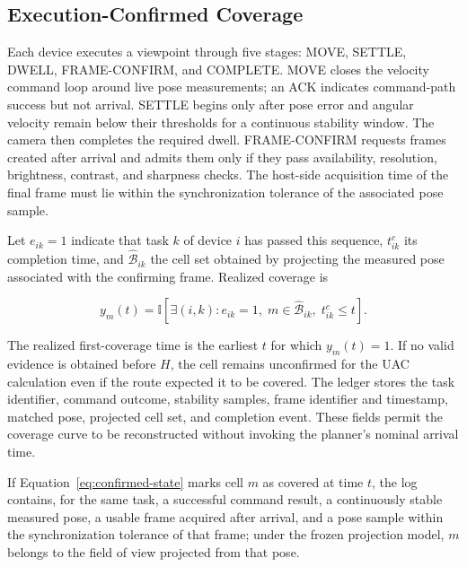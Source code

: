 \subsection{Execution-Confirmed Coverage}

Each device executes a viewpoint through five stages: MOVE, SETTLE, DWELL, FRAME-CONFIRM, and COMPLETE. MOVE closes the velocity command loop around live pose measurements; an ACK indicates command-path success but not arrival. SETTLE begins only after pose error and angular velocity remain below their thresholds for a continuous stability window. The camera then completes the required dwell. FRAME-CONFIRM requests frames created after arrival and admits them only if they pass availability, resolution, brightness, contrast, and sharpness checks. The host-side acquisition time of the final frame must lie within the synchronization tolerance of the associated pose sample.

Let $e_{ik}=1$ indicate that task $k$ of device $i$ has passed this sequence, $t^c_{ik}$ its completion time, and $\widehat{\mathcal B}_{ik}$ the cell set obtained by projecting the measured pose associated with the confirming frame. Realized coverage is

\begin{equation}\label{eq:confirmed-state}
y_m(t)=\mathbb I\!\left[\exists(i,k): e_{ik}=1,\;
m\in\widehat{\mathcal B}_{ik},\;t^c_{ik}\leq t\right].
\end{equation}

The realized first-coverage time is the earliest $t$ for which $y_m(t)=1$. If no valid evidence is obtained before $H$, the cell remains unconfirmed for the UAC calculation even if the route expected it to be covered. The ledger stores the task identifier, command outcome, stability samples, frame identifier and timestamp, matched pose, projected cell set, and completion event. These fields permit the coverage curve to be reconstructed without invoking the planner's nominal arrival time.

\begin{proposition}\label{prop:evidence}
If Equation~\eqref{eq:confirmed-state} marks cell $m$ as covered at time $t$, the log contains, for the same task, a successful command result, a continuously stable measured pose, a usable frame acquired after arrival, and a pose sample within the synchronization tolerance of that frame; under the frozen projection model, $m$ belongs to the field of view projected from that pose.
\end{proposition}

